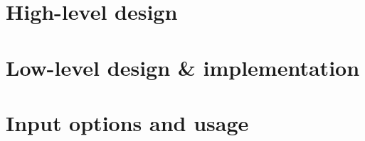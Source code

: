 \section{High-level design}
\label{sec:simreplaychap-design}


\section{Low-level design \& implementation}
\label{sec:simreplaychap-implementation}


\section{Input options and usage}
\label{sec:simreplaychap-usage}

